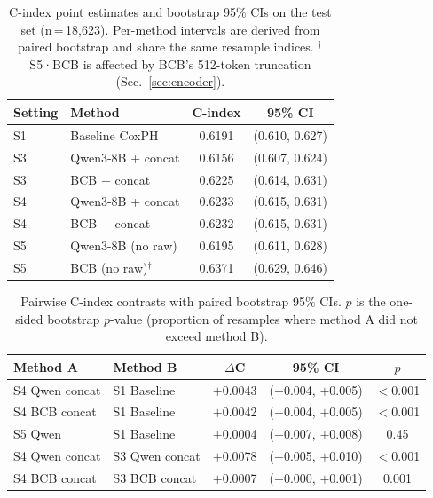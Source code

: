 \begin{table}[ht]
\centering
\caption{C-index point estimates and bootstrap 95\% CIs on the test set
         (n\,=\,18{,}623). Per-method intervals are derived from paired
         bootstrap and share the same resample indices.
         $^\dagger$S5·BCB is affected by BCB's 512-token truncation (Sec.~\ref{sec:encoder}).}
\label{tab:boot_ci}
\begin{tabular}{llcc}
\toprule
Setting & Method & C-index & 95\% CI \\
\midrule
S1 & Baseline CoxPH                    & 0.6191 & (0.610, 0.627) \\
\midrule
S3 & Qwen3-8B + concat                 & 0.6156 & (0.607, 0.624) \\
S3 & BCB + concat                      & 0.6225 & (0.614, 0.631) \\
\midrule
S4 & Qwen3-8B + concat                 & 0.6233 & (0.615, 0.631) \\
S4 & BCB + concat                      & 0.6232 & (0.615, 0.631) \\
\midrule
S5 & Qwen3-8B (no raw)                 & 0.6195 & (0.611, 0.628) \\
S5 & BCB (no raw)$^\dagger$            & 0.6371 & (0.629, 0.646) \\
\bottomrule
\end{tabular}
\end{table}

\begin{table}[ht]
\centering
\caption{Pairwise C-index contrasts with paired bootstrap 95\% CIs.
         $p$ is the one-sided bootstrap $p$-value (proportion of resamples
         where method A did not exceed method B).}
\label{tab:boot_contrasts}
\begin{tabular}{llccc}
\toprule
Method A & Method B & $\Delta$C & 95\% CI & $p$ \\
\midrule
S4 Qwen concat & S1 Baseline   & $+$0.0043 & ($+$0.004, $+$0.005) & $<$0.001 \\
S4 BCB concat  & S1 Baseline   & $+$0.0042 & ($+$0.004, $+$0.005) & $<$0.001 \\
S5 Qwen        & S1 Baseline   & $+$0.0004 & ($-$0.007, $+$0.008) & 0.45     \\
S4 Qwen concat & S3 Qwen concat & $+$0.0078 & ($+$0.005, $+$0.010) & $<$0.001 \\
S4 BCB concat  & S3 BCB concat  & $+$0.0007 & ($+$0.000, $+$0.001) & 0.001    \\
\bottomrule
\end{tabular}
\end{table}

